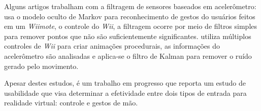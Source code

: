 \documentclass[conference]{IEEEtran}
\begin{document}
Alguns artigos trabalham com a filtragem de sensores baseados em acelerômetro: \cite{schlomer2008gesture} usa o modelo oculto de Markov para reconhecimento de gestos do usuários feitos em um \textit{Wiimote}, o controle do \textit{Wii}, a filtragem ocorre por meio de filtros simples para remover pontos que não são suficientemente significantes. \cite{shiratori2008accelerometer} utiliza múltiplos controles de \textit{Wii} para criar animações procedurais, as informações do acelerômetro são analisadas e aplica-se o filtro de Kalman para remover o ruído  gerado pelo movimento.

Apesar destes estudos, \cite{VRDataGlove} é um trabalho em progresso que reporta um estudo de usabilidade que visa determinar a efetividade entre dois tipos de entrada para realidade virtual: controle e gestos de mão. 

\end{document}
